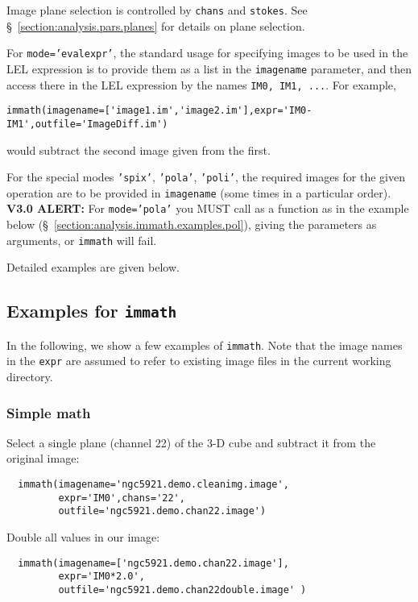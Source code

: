 Image plane selection is controlled by {\tt chans} and {\tt stokes}.
See \S~\ref{section:analysis.pars.planes} for details on plane
selection.

For {\tt mode='evalexpr'}, the standard usage for specifying images to
be used in the LEL expression is to provide them as a list in the {\tt imagename}
parameter, and then access there in the LEL expression by the
names {\tt IM0, IM1, ...}.  For example,
\small
\begin{verbatim}
immath(imagename=['image1.im','image2.im'],expr='IM0-IM1',outfile='ImageDiff.im')
\end{verbatim}
\normalsize
would subtract the second image given from the first.

For the special modes {\tt 'spix'}, {\tt 'pola'}, {\tt 'poli'}, the
required images for the given operation are to be provided in 
{\tt imagename} (some times in a particular order). 
{\bf V3.0 ALERT:} For {\tt mode='pola'} you MUST call as a function as
in the example below (\S~\ref{section:analysis.immath.examples.pol}), 
giving the parameters as arguments, or {\tt immath} will fail.

Detailed examples are given below.

\subsection{Examples for {\tt immath}}
\label{section:analysis.immath.examples}

In the following, we show a few examples of {\tt immath}. Note that the image
names in the {\tt expr} are assumed to refer to existing image files
in the current working directory.

\subsubsection{Simple math}
\label{section:analysis.immath.examples.math}

Select a single plane (channel 22) of the 3-D cube and  
subtract it from the original image: 
\small
\begin{verbatim}
  immath(imagename='ngc5921.demo.cleanimg.image',
         expr='IM0',chans='22',
         outfile='ngc5921.demo.chan22.image')
\end{verbatim}
\normalsize

Double all values in our image:
\small
\begin{verbatim}
  immath(imagename=['ngc5921.demo.chan22.image'],
         expr='IM0*2.0',
         outfile='ngc5921.demo.chan22double.image' )
\end{verbatim}
\normalsize
    
